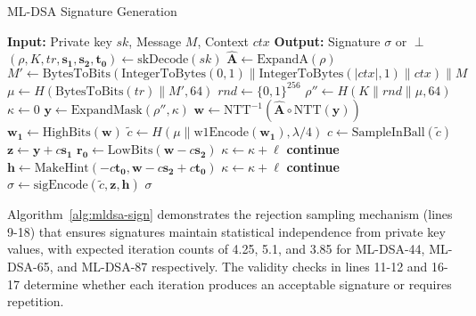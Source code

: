 \documentclass[journal=tches,final]{iacrtrans}
\newcommand{\Input}[1]{\STATE \textbf{Input:} #1}
\newcommand{\Output}[1]{\STATE \textbf{Output:} #1}
\begin{document}
\begin{algorithm}[h]
  \caption{ML-DSA Signature Generation}
  \label{alg:mldsa-sign}
  \begin{algorithmic}[1]
    \Input{Private key $sk$, Message $M$, Context $ctx$}
    \Output{Signature $\sigma$ or $\perp$}
    \STATE $(\rho, K, tr, \mathbf{s_1}, \mathbf{s_2}, \mathbf{t_0}) \leftarrow \text{skDecode}(sk)$
    \STATE $\hat{\mathbf{A}} \leftarrow \text{ExpandA}(\rho)$
    \STATE $M' \leftarrow \text{BytesToBits}(\text{IntegerToBytes}(0,1) \| \text{IntegerToBytes}(|ctx|,1) \| ctx) \| M$
    \STATE $\mu \leftarrow H(\text{BytesToBits}(tr) \| M', 64)$
    \STATE $rnd \leftarrow \{0,1\}^{256}$ 
    \STATE $\rho'' \leftarrow H(K \| rnd \| \mu, 64)$
    \STATE $\kappa \leftarrow 0$
    \REPEAT
    \STATE $\mathbf{y} \leftarrow \text{ExpandMask}(\rho'', \kappa)$ 
    \STATE $\mathbf{w} \leftarrow \text{NTT}^{-1}(\hat{\mathbf{A}} \circ \text{NTT}(\mathbf{y}))$
    \STATE $\mathbf{w_1} \leftarrow \text{HighBits}(\mathbf{w})$
    \STATE $\tilde{c} \leftarrow H(\mu \| \text{w1Encode}(\mathbf{w_1}), \lambda/4)$
    \STATE $c \leftarrow \text{SampleInBall}(\tilde{c})$ 
    \STATE $\mathbf{z} \leftarrow \mathbf{y} + c \mathbf{s_1}$
    \STATE $\mathbf{r_0} \leftarrow \text{LowBits}(\mathbf{w} - c\mathbf{s_2})$
    \STATE $\kappa \leftarrow \kappa + \ell$
    \STATE \textbf{continue}
    \ENDIF
    \STATE $\mathbf{h} \leftarrow \text{MakeHint}(-c\mathbf{t_0}, \mathbf{w} - c\mathbf{s_2} + c\mathbf{t_0})$
    \STATE $\kappa \leftarrow \kappa + \ell$
    \STATE \textbf{continue}
    \ENDIF
    \STATE $\sigma \leftarrow \text{sigEncode}(\tilde{c}, \mathbf{z}, \mathbf{h})$
    \RETURN $\sigma$
  \end{algorithmic}
\end{algorithm}

Algorithm~\ref{alg:mldsa-sign} demonstrates the rejection sampling mechanism (lines 9-18) that ensures signatures maintain statistical independence from private key values, with expected iteration counts of 4.25, 5.1, and 3.85 for ML-DSA-44, ML-DSA-65, and ML-DSA-87 respectively. The validity checks in lines 11-12 and 16-17 determine whether each iteration produces an acceptable signature or requires repetition.
\end{document}

